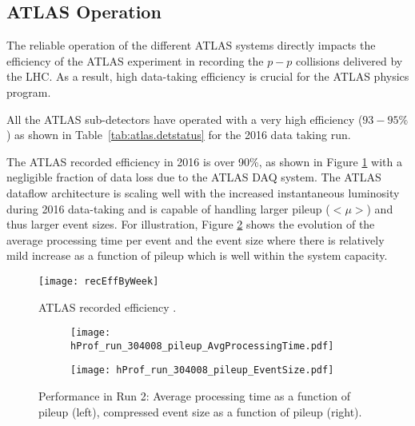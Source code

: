 \subsection{ATLAS Operation}

The reliable operation of the different ATLAS systems directly impacts the 
efficiency of the ATLAS experiment 
in recording the $p-p$ collisions delivered by the LHC. 
As a result, high data-taking efficiency is crucial 
for the ATLAS physics program. 

All the ATLAS sub-detectors have operated with a very high efficiency 
($93-95\%$) as shown in Table~\ref{tab:atlas.detstatus} for the 2016 
data taking run.

The ATLAS recorded efficiency in 2016 is over 90\%, as shown in 
Figure \ref{fig:tdaq_diagram} with a negligible fraction of data loss due to 
the ATLAS DAQ system. 
The ATLAS dataflow architecture is scaling well with the increased 
instantaneous luminosity during 2016 data-taking and is capable of handling 
larger pileup ($<\mu>$) and thus larger event sizes.
For illustration,  Figure \ref{fig:run_pileup} shows the evolution of the 
average processing time per event and 
the event size where there is relatively mild increase as a function of pileup 
which is well within the system capacity.

\begin{figure}[t!]
\centering
\texttt{[image: recEffByWeek]} 
\caption{ATLAS recorded efficiency \cite{atlasTwiki}.}
\label{fig:tdaq_diagram}
\end{figure} 


\begin{figure}[t!]
\centering
\begin{subfigure}[t]{0.48\textwidth}
\texttt{[image: hProf\_run\_304008\_pileup\_AvgProcessingTime.pdf]}
\end{subfigure}
\begin{subfigure}[t]{0.48\textwidth}
\texttt{[image: hProf\_run\_304008\_pileup\_EventSize.pdf]}
\end{subfigure}
\vspace{-0.3cm}
\caption{Performance in Run 2: Average processing time as a function of pileup (left), compressed event size as a function of pileup (right).}
\label{fig:run_pileup}
\end{figure} 



